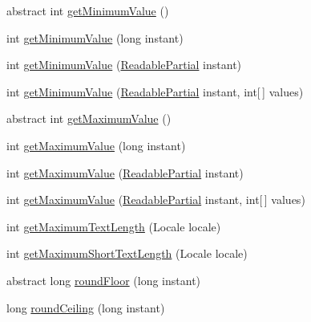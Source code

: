 \begin{DoxyCompactItemize}
\item 
abstract int \hyperlink{classorg_1_1joda_1_1time_1_1field_1_1_base_date_time_field_a9902f902cd4909aff1ca967dc5e10d72}{get\-Minimum\-Value} ()
\item 
int \hyperlink{classorg_1_1joda_1_1time_1_1field_1_1_base_date_time_field_a8909937af743fe7718c166c201db606a}{get\-Minimum\-Value} (long instant)
\item 
int \hyperlink{classorg_1_1joda_1_1time_1_1field_1_1_base_date_time_field_a53354cf507d725fc6ade418229c2369c}{get\-Minimum\-Value} (\hyperlink{interfaceorg_1_1joda_1_1time_1_1_readable_partial}{Readable\-Partial} instant)
\item 
int \hyperlink{classorg_1_1joda_1_1time_1_1field_1_1_base_date_time_field_a2ebdf5a73813958da0f815781bf82ec9}{get\-Minimum\-Value} (\hyperlink{interfaceorg_1_1joda_1_1time_1_1_readable_partial}{Readable\-Partial} instant, int\mbox{[}$\,$\mbox{]} values)
\item 
abstract int \hyperlink{classorg_1_1joda_1_1time_1_1field_1_1_base_date_time_field_a0c573fe3864e64e1935dd633069cdeed}{get\-Maximum\-Value} ()
\item 
int \hyperlink{classorg_1_1joda_1_1time_1_1field_1_1_base_date_time_field_a8f635b10bd232ae87a8af9243bbc0ec6}{get\-Maximum\-Value} (long instant)
\item 
int \hyperlink{classorg_1_1joda_1_1time_1_1field_1_1_base_date_time_field_a169798526a079722589241c97a767027}{get\-Maximum\-Value} (\hyperlink{interfaceorg_1_1joda_1_1time_1_1_readable_partial}{Readable\-Partial} instant)
\item 
int \hyperlink{classorg_1_1joda_1_1time_1_1field_1_1_base_date_time_field_a38d740aa9d09987e8f0d2f4d9c9c7d3b}{get\-Maximum\-Value} (\hyperlink{interfaceorg_1_1joda_1_1time_1_1_readable_partial}{Readable\-Partial} instant, int\mbox{[}$\,$\mbox{]} values)
\item 
int \hyperlink{classorg_1_1joda_1_1time_1_1field_1_1_base_date_time_field_a5672970ee782727ef9cd55de6a84693d}{get\-Maximum\-Text\-Length} (Locale locale)
\item 
int \hyperlink{classorg_1_1joda_1_1time_1_1field_1_1_base_date_time_field_a0d224bc37adfdd315dfd06088bdb5a0c}{get\-Maximum\-Short\-Text\-Length} (Locale locale)
\item 
abstract long \hyperlink{classorg_1_1joda_1_1time_1_1field_1_1_base_date_time_field_a4708ea912777d8dc5e9c6a8eaef33473}{round\-Floor} (long instant)
\item 
long \hyperlink{classorg_1_1joda_1_1time_1_1field_1_1_base_date_time_field_a89b976c02eb66612a5be66fa7f3d5844}{round\-Ceiling} (long instant)

\end{DoxyCompactItemize}
